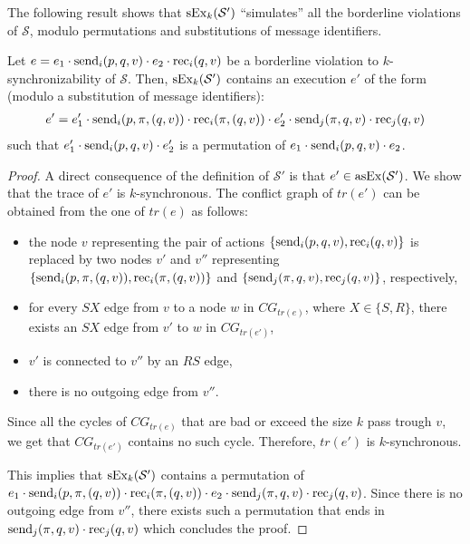 The following result shows that $\synchExec{\mathcal{S'}}{k}$ ``simulates'' all the borderline violations of $\mathcal{S}$, modulo permutations and substitutions of message identifiers. 

\begin{theorem}
Let $e=e_1\cdot \send{i}{p,q,v}\cdot e_2\cdot \rec{i}{q,v}$ be a borderline violation to $k$-synchronizability of $\mathcal{S}$. Then, $\synchExec{\mathcal{S'}}{k}$ contains an execution $e'$ of the form (modulo a substitution of message identifiers): 
\begin{align*}
e'=e_1'\cdot \send{i}{p,\pi,(q,v)}\cdot \rec{i}{\pi,(q,v)}\cdot e_2'\cdot \send{j}{\pi,q,v}\cdot \rec{j}{q,v}
\end{align*}
such that $e_1'\cdot \send{i}{p,q,v} \cdot e_2'$ is a permutation of $e_1\cdot \send{i}{p,q,v}\cdot e_2$.
\end{theorem}
\begin{proof}
A direct consequence of the definition of $\mathcal{S'}$ is that $e'\in\asynchExec{\mathcal{S'}}$. We show that the trace of $e'$ is $k$-synchronous. The conflict graph of $tr(e')$ can be obtained from the one of $tr(e)$ as follows:
\begin{itemize}
	\item the node $v$ representing the pair of actions $\{\send{i}{p,q,v},\rec{i}{q,v}\}$ is replaced by two nodes $v'$ and $v''$ representing $\{\send{i}{p,\pi,(q,v)}, \rec{i}{\pi,(q,v)}\}$ and $\{\send{j}{\pi,q,v}, \rec{j}{q,v}\}$, respectively,
	\item for every $SX$ edge from $v$ to a node $w$ in $CG_{tr(e)}$, where $X\in\{S,R\}$, there exists an $SX$ edge from $v'$ to $w$ in $CG_{tr(e')}$,
	\item $v'$ is connected to $v''$ by an $RS$ edge,
	\item there is no outgoing edge from $v''$.
\end{itemize}
Since all the cycles of $CG_{tr(e)}$ that are bad or exceed the size $k$ pass trough $v$, we get that $CG_{tr(e')}$ contains no such cycle.
Therefore, $tr(e')$ is $k$-synchronous. 

This implies that $\synchExec{\mathcal{S'}}{k}$ contains a permutation of $e_1\cdot \send{i}{p,\pi,(q,v)}\cdot \rec{i}{\pi,(q,v)}\cdot e_2\cdot \send{j}{\pi,q,v}\cdot \rec{j}{q,v}$. Since there is no outgoing edge from $v''$, there exists such a permutation that ends in $\send{j}{\pi,q,v}\cdot \rec{j}{q,v}$ which concludes the proof.
\end{proof}

